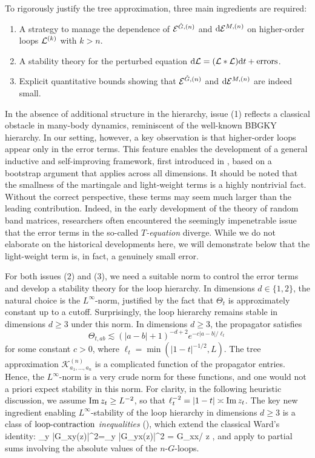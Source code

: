 To rigorously justify the tree approximation, three main ingredients are required:
\begin{enumerate}
	\item[(1)] A strategy to manage the dependence of \( {\cal E}^{\Gc,(n)} \) and \( \dd {\cal E}^{M,(n)} \) on higher-order loops \( {\cal L}^{(k)} \) with \( k > n \).
	\item[(2)]  A stability theory for the perturbed equation \( \dd {\cal L}= ({\cal L} \ast {\cal L})\dd t + \text{errors} \).
	\item[(3)] Explicit quantitative bounds showing that  \( {\cal E}^{\Gc,(n)} \) and \( \dd {\cal E}^{M,(n)} \) are indeed small.
\end{enumerate} 
In the absence of additional structure in the hierarchy, issue (1) reflects a classical obstacle in many-body dynamics, reminiscent of the well-known BBGKY hierarchy. 
In our setting, however, a key observation is that higher-order loops appear only in the error terms. This feature enables the development of a general inductive and self-improving framework, first introduced in \cite{YY_25}, based on a bootstrap argument that applies across all dimensions. It should be noted that the smallness of the martingale and light-weight terms is a highly nontrivial fact. 
Without the correct perspective, these terms may seem much larger than the leading contribution.
Indeed, in the early development of the theory of random band matrices, researchers often encountered the seemingly impenetrable issue that the error terms in the so-called \emph{$T$-equation} diverge. While we do not elaborate on the historical developments here, we will demonstrate below that the light-weight term is, in fact, a genuinely small error.


For both issues (2) and (3), we need a suitable norm to control the error terms and develop a stability theory for the loop hierarchy.  
In dimensions \( d \in \{1,2\} \), the natural choice is the \( L^\infty \)-norm, justified by the fact that \( \Theta_t \) is approximately constant up to a cutoff.  
Surprisingly, the loop hierarchy remains stable in dimensions \( d \geq 3 \) under this norm. In dimensions $d\ge 3$, the propagator satisfies
\[
\Theta_{t,ab} \lesssim (|a-b|+1)^{-d+2} e^{- c|a-b|/\ell_t }
\]
for some constant \( c>0 \), where \( \ell_t  = \min(|1-t|^{-1/2},L)\). The tree approximation \( \mathcal{K}^{(n)}_{a_1, \ldots, a_n} \) is a complicated function of the propagator entries. Hence, the \( L^\infty \)-norm is a very crude norm for these functions, and one would not a priori expect stability in this norm.   
For clarity, in the following heuristic discussion, we assume \( \im z_t \ge L^{-2} \), so that \( \ell_t^{-2} = |1-t| \asymp \im z_t \). The key new ingredient enabling \( L^\infty \)-stability of the loop hierarchy in dimensions \( d \ge 3 \) is a class of \emph{$\contract$ inequalities} (), which extend the classical Ward's identity:
\be\label{eq:Ward_intro1}
\sum_y |G_{xy}(z)|^2=\sum_y |G_{yx}(z)|^2 =  \im G_{xx}/ \im z ,
\ee
and apply to partial sums involving the absolute values of the $n$-\(G\)-loops. 


